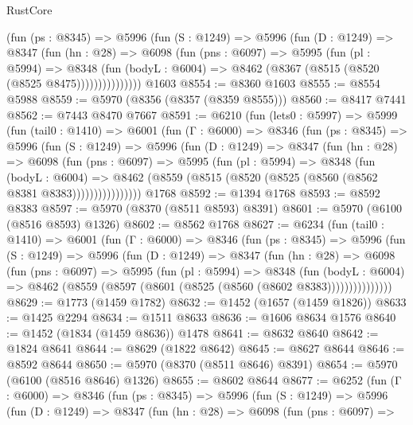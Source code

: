 \begin{lexlean}{RustCore}
\begin{coremodule}
{\begin{coremodule}
{{{{{{{{{{{{{{{{{{{{{{{{{{{{{{{{{{{{{{{{{{{{{            (fun (ps : @8345) =>
            @5996
              (fun (S : @1249) =>
              @5996
                (fun (D : @1249) =>
                @8347
                  (fun (hn : @28) =>
                  @6098
                    (fun (pns : @6097) =>
                    @5995
                      (fun (pl : @5994) =>
                      @8348
                        (fun (bodyL : @6004) =>
                        @8462 (@8367 (@8515 (@8520 (@8525 @8475)))))))))))))))
    @1603
@8554 := @8360 @1603
@8555 := @8554 @5988
@8559 := @5970 (@8356 (@8357 (@8359 @8555)))
@8560 := @8417 @7441
@8562 := @7443 @8470 @7667
@8591 := @6210
    (fun (lets0 : @5997) =>
    @5999
      (fun (tail0 : @1410) =>
      @6001
        (fun (Γ : @6000) =>
        @8346
          (fun (ps : @8345) =>
          @5996
            (fun (S : @1249) =>
            @5996
              (fun (D : @1249) =>
              @8347
                (fun (hn : @28) =>
                @6098
                  (fun (pns : @6097) =>
                  @5995
                    (fun (pl : @5994) =>
                    @8348
                      (fun (bodyL : @6004) =>
                      @8462 (@8559 (@8515 (@8520 (@8525 (@8560 (@8562 @8381 @8383))))))))))))))))
    @1768
@8592 := @1394 @1768
@8593 := @8592 @8383
@8597 := @5970 (@8370 (@8511 @8593) @8391)
@8601 := @5970 (@6100 (@8516 @8593) @1326)
@8602 := @8562 @1768
@8627 := @6234
    (fun (tail0 : @1410) =>
    @6001
      (fun (Γ : @6000) =>
      @8346
        (fun (ps : @8345) =>
        @5996
          (fun (S : @1249) =>
          @5996
            (fun (D : @1249) =>
            @8347
              (fun (hn : @28) =>
              @6098
                (fun (pns : @6097) =>
                @5995
                  (fun (pl : @5994) =>
                  @8348
                    (fun (bodyL : @6004) =>
                    @8462 (@8559 (@8597 (@8601 (@8525 (@8560 (@8602 @8383)))))))))))))))
@8629 := @1773 (@1459 @1782)
@8632 := @1452 (@1657 (@1459 @1826))
@8633 := @1425 @2294
@8634 := @1511 @8633
@8636 := @1606 @8634 @1576
@8640 := @1452 (@1834 (@1459 @8636)) @1478
@8641 := @8632 @8640
@8642 := @1824 @8641
@8644 := @8629 (@1822 @8642)
@8645 := @8627 @8644
@8646 := @8592 @8644
@8650 := @5970 (@8370 (@8511 @8646) @8391)
@8654 := @5970 (@6100 (@8516 @8646) @1326)
@8655 := @8602 @8644
@8677 := @6252
    (fun (Γ : @6000) =>
    @8346
      (fun (ps : @8345) =>
      @5996
        (fun (S : @1249) =>
        @5996
          (fun (D : @1249) =>
          @8347
            (fun (hn : @28) =>
            @6098
              (fun (pns : @6097) =>
}}}}}}}}}}}}}}}}}}}}}}}}}}}}}}}}}}}}}}}}}}}}}
\end{coremodule}}
\end{coremodule}
\end{lexlean}
